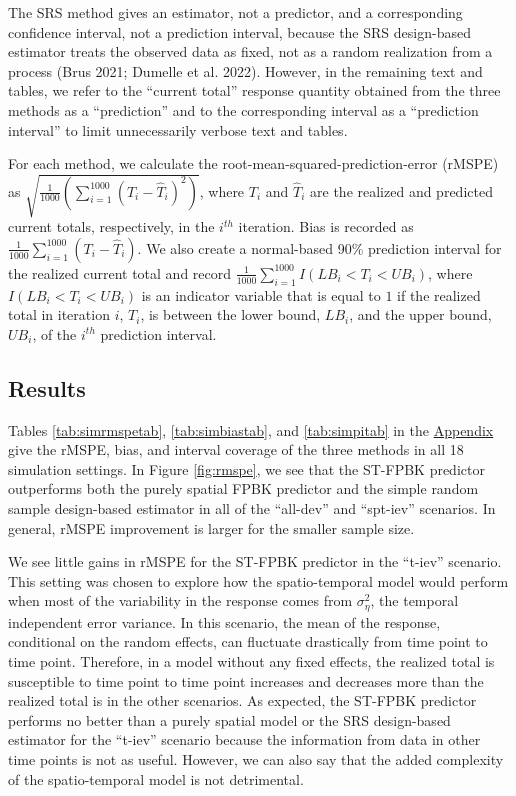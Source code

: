 \documentclass[]{article}    %
\begin{document}
The SRS method gives an estimator, not a predictor, and a corresponding
confidence interval, not a prediction interval, because the SRS
design-based estimator treats the observed data as fixed, not as a
random realization from a process (Brus 2021; Dumelle et al. 2022).
However, in the remaining text and tables, we refer to the ``current
total'' response quantity obtained from the three methods as a
``prediction'' and to the corresponding interval as a ``prediction
interval'' to limit unnecessarily verbose text and tables.

For each method, we calculate the root-mean-squared-prediction-error
(rMSPE) as
\(\sqrt{\frac{1}{1000}(\sum_{i = 1}^{1000}(T_i - \hat{T}_i)^2)}\), where
\(T_i\) and \(\hat{T}_i\) are the realized and predicted current totals,
respectively, in the \(i^{th}\) iteration. Bias is recorded as
\(\frac{1}{1000}\sum_{i = 1}^{1000}(T_i - \hat{T}_i)\). We also create a
normal-based 90\% prediction interval for the realized current total and
record \(\frac{1}{1000} \sum_{i = 1}^{1000}I(LB_i < T_i < UB_i)\), where
\(I(LB_i < T_i < UB_i)\) is an indicator variable that is equal to \(1\)
if the realized total in iteration \(i\), \(T_i\), is between the lower
bound, \(LB_i\), and the upper bound, \(UB_i\), of the \(i^{th}\)
prediction interval.

\hypertarget{results}{%
\subsection{Results}\label{results}}

Tables \ref{tab:simrmspetab}, \ref{tab:simbiastab}, and
\ref{tab:simpitab} in the \protect\hyperlink{appendix}{Appendix} give
the rMSPE, bias, and interval coverage of the three methods in all 18
simulation settings. In Figure \ref{fig:rmspe}, we see that the ST-FPBK
predictor outperforms both the purely spatial FPBK predictor and the
simple random sample design-based estimator in all of the ``all-dev''
and ``spt-iev'' scenarios. In general, rMSPE improvement is larger for
the smaller sample size.

We see little gains in rMSPE for the ST-FPBK predictor in the ``t-iev''
scenario. This setting was chosen to explore how the spatio-temporal
model would perform when most of the variability in the response comes
from \(\sigma^2_{\eta}\), the temporal independent error variance. In
this scenario, the mean of the response, conditional on the random
effects, can fluctuate drastically from time point to time point.
Therefore, in a model without any fixed effects, the realized total is
susceptible to time point to time point increases and decreases more
than the realized total is in the other scenarios. As expected, the
ST-FPBK predictor performs no better than a purely spatial model or the
SRS design-based estimator for the ``t-iev'' scenario because the
information from data in other time points is not as useful. However, we
can also say that the added complexity of the spatio-temporal model is
not detrimental.
\end{document}
